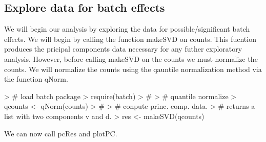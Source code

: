 \documentclass{article}
\begin{document}
\subsection{Explore data for batch effects}
We will begin our analysis by exploring the data for possible/significant batch effects. We will 
begin by calling the function makeSVD on counts. This fucntion produces the pricipal components 
data necessary for any futher exploratory analysis. However, before calling makeSVD on the
counts we must normalize the counts. We will normalize the counts using the qauntile normalization 
method via the function qNorm.
\begin{Schunk}
\begin{Sinput}
> # load batch package
> require(batch)
> #
> # quantile normalize
> qcounts <- qNorm(counts)
> #
> # conpute princ. comp. data. 
> # returns a list with two components v and d.
> res <- makeSVD(qcounts)
\end{Sinput}
\end{Schunk}
We can now call pcRes and plotPC.
\end{document}
